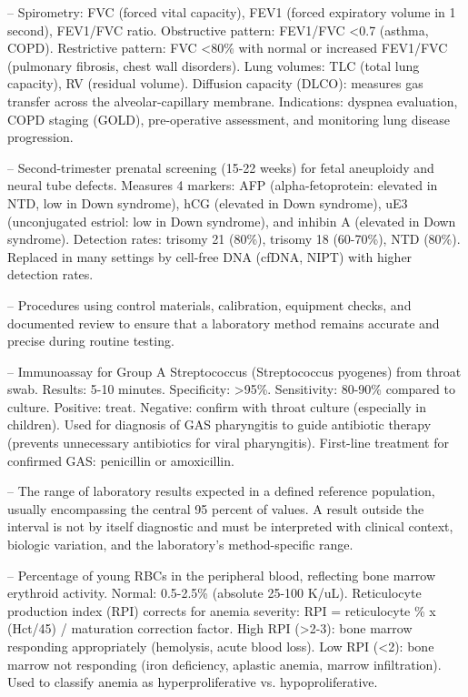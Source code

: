 -- Spirometry: FVC (forced vital capacity), FEV1 (forced expiratory volume in 1 second), FEV1/FVC ratio. Obstructive pattern: FEV1/FVC <0.7 (asthma, COPD). Restrictive pattern: FVC <80\% with normal or increased FEV1/FVC (pulmonary fibrosis, chest wall disorders). Lung volumes: TLC (total lung capacity), RV (residual volume). Diffusion capacity (DLCO): measures gas transfer across the alveolar-capillary membrane. Indications: dyspnea evaluation, COPD staging (GOLD), pre-operative assessment, and monitoring lung disease progression.

-- Second-trimester prenatal screening (15-22 weeks) for fetal aneuploidy and neural tube defects. Measures 4 markers: AFP (alpha-fetoprotein: elevated in NTD, low in Down syndrome), hCG (elevated in Down syndrome), uE3 (unconjugated estriol: low in Down syndrome), and inhibin A (elevated in Down syndrome). Detection rates: trisomy 21 (80\%), trisomy 18 (60-70\%), NTD (80\%). Replaced in many settings by cell-free DNA (cfDNA, NIPT) with higher detection rates.

-- Procedures using control materials, calibration, equipment checks, and documented review to ensure that a laboratory method remains accurate and precise during routine testing.

-- Immunoassay for Group A Streptococcus (Streptococcus pyogenes) from throat swab. Results: 5-10 minutes. Specificity: >95\%. Sensitivity: 80-90\% compared to culture. Positive: treat. Negative: confirm with throat culture (especially in children). Used for diagnosis of GAS pharyngitis to guide antibiotic therapy (prevents unnecessary antibiotics for viral pharyngitis). First-line treatment for confirmed GAS: penicillin or amoxicillin.

-- The range of laboratory results expected in a defined reference population, usually encompassing the central 95 percent of values. A result outside the interval is not by itself diagnostic and must be interpreted with clinical context, biologic variation, and the laboratory’s method-specific range.

-- Percentage of young RBCs in the peripheral blood, reflecting bone marrow erythroid activity. Normal: 0.5-2.5\% (absolute 25-100 K/uL). Reticulocyte production index (RPI) corrects for anemia severity: RPI = reticulocyte \% x (Hct/45) / maturation correction factor. High RPI (>2-3): bone marrow responding appropriately (hemolysis, acute blood loss). Low RPI (<2): bone marrow not responding (iron deficiency, aplastic anemia, marrow infiltration). Used to classify anemia as hyperproliferative vs. hypoproliferative.

